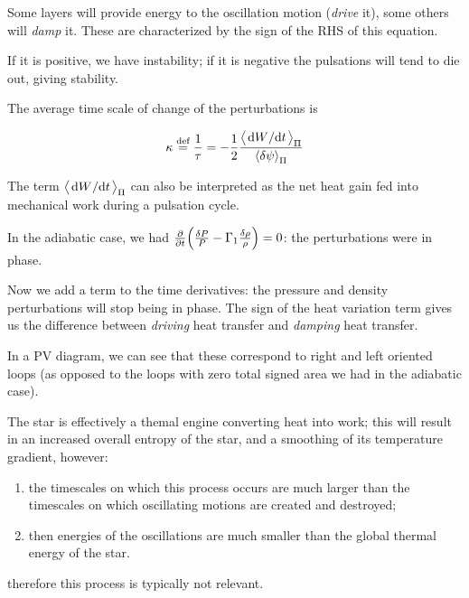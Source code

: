 \documentclass[main.tex]{subfiles}
\begin{document}
Some layers will provide energy to the oscillation motion (\emph{drive} it), some others will \emph{damp} it.
These are characterized by the sign of the RHS of this equation.

If it is positive, we have instability; if it is negative the pulsations will tend to die out, giving stability.

The average time scale of change of the perturbations is

\begin{equation}
  \kappa \defeq \frac{1}{\tau} = -\frac{1}{2} \frac{\expval{\dv*{W}{t}}_\Pi}{\expval{ \delta \psi}_\Pi }
\end{equation}

The term \(\expval{\dv*{W}{t}}_\Pi \) can also be interpreted as the net heat gain fed into mechanical work during a pulsation cycle.

In the adiabatic case, we had \(\pdv{}{t}\qty( \frac{\delta P}{P} - \Gamma_1 \frac{\delta \rho}{\rho}) =0 \): the perturbations were in phase.

Now we add a term to the time derivatives: the pressure and density perturbations will stop being in phase. The sign of the heat variation term gives us the difference between \emph{driving} heat transfer and \emph{damping} heat transfer.

In a PV diagram, we can see that these correspond to right and left oriented loops (as opposed to the loops with zero total signed area we had in the adiabatic case).

\begin{bluebox}
    The star is effectively a themal engine converting heat into work; this will result in an increased overall entropy of the star, and a smoothing of its temperature gradient, however:
    \begin{enumerate}
        \item the timescales on which this process occurs are much larger than the timescales on which oscillating motions are created and destroyed;
        \item then energies of the oscillations are much smaller than the global thermal energy of the star.
    \end{enumerate}
    therefore this process is typically not relevant.
\end{bluebox}
\end{document}

